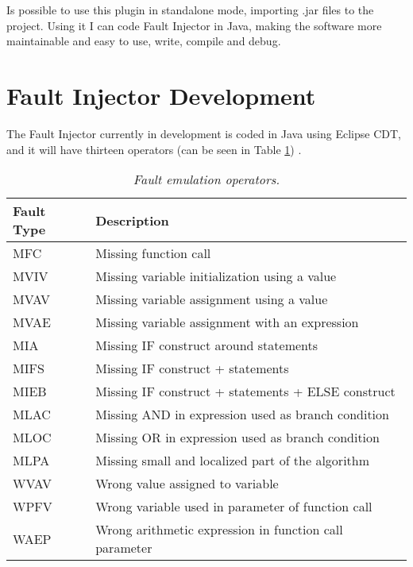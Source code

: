 Is possible to use this plugin in standalone mode, importing .jar files to the project.
Using it I can code Fault Injector in Java, making the software more maintainable and easy to use, write, compile and debug.
\\





\newpage
\section{Fault Injector Development}

The Fault Injector currently in development is coded in Java using Eclipse CDT, and it will have thirteen operators (can be seen in Table \ref{tab:faultEmulationOperators})
\cite{duraes2005thesis}.

\begin{table}[!ht]
\begin{tabular}{l|l}
\hline
Fault Type & Description                                            \\ \hline
MFC        & Missing function call                                  \\
MVIV       & Missing variable initialization using a value          \\
MVAV       & Missing variable assignment using a value              \\
MVAE       & Missing variable assignment with an expression         \\
MIA        & Missing IF construct around statements                 \\
MIFS       & Missing IF construct + statements                      \\
MIEB       & Missing IF construct + statements + ELSE construct     \\
MLAC       & Missing AND in expression used as branch condition     \\
MLOC       & Missing OR in expression used as branch condition      \\
MLPA       & Missing small and localized part of the algorithm      \\
WVAV       & Wrong value assigned to variable                       \\
WPFV       & Wrong variable used in parameter of function call      \\
WAEP       & Wrong arithmetic expression in function call parameter \\ \hline
\end{tabular}
\caption{\small \sl Fault emulation operators.\label{tab:faultEmulationOperators}}
\end{table}

